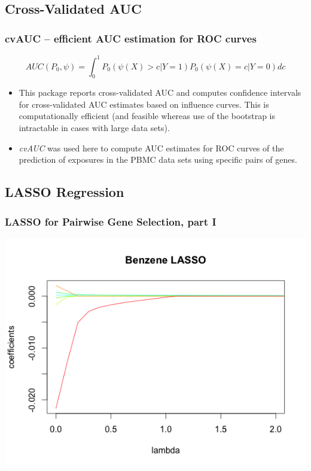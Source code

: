 \documentclass{beamer}
\begin{document}
\subsection{Cross-Validated AUC}

\begin{frame}[fragile]
  	\frametitle{cvAUC -- efficient AUC estimation for ROC curves}
 		$$AUC(P_{0},\psi) = \int_{0}^{1} P_{0}(\psi(X) > c | Y=1) P_{0}(\psi(X) = c | Y=0) dc$$
		\begin{itemize}
			\item This package reports cross-validated AUC and computes confidence intervals for cross-validated AUC estimates based on influence curves. This is computationally efficient (and feasible whereas use of the bootstrap is intractable in cases with large data sets).
			\item \textit{cvAUC} was used here to compute AUC estimates for ROC curves of the prediction of exposures in the PBMC data sets using specific pairs of genes.
		\end{itemize}
\end{frame}

\subsection{LASSO Regression}

\begin{frame}[fragile]
  	\frametitle{LASSO for Pairwise Gene Selection, part I}
		\centering
 		\includegraphics[scale=0.5]{../paper/figs/lasso_coef.png}
\end{frame}
\end{document}
